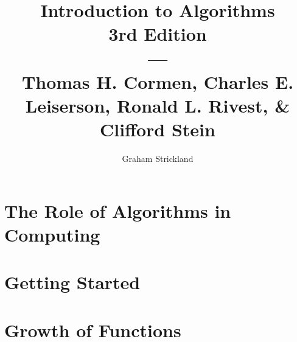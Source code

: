 \documentclass{article}
\title{
    Introduction to Algorithms\\3rd Edition\\---\\
    Thomas H. Cormen, Charles E. Leiserson, Ronald L. Rivest, \& Clifford Stein
}
\author{Graham Strickland}
\begin{document}
\maketitle  

\section{The Role of Algorithms in Computing}


\section{Getting Started}


\section{Growth of Functions}

\end{document}
